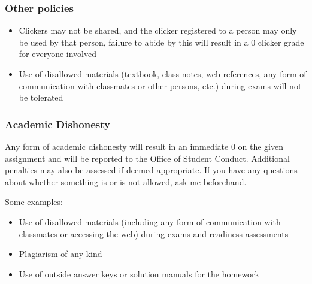 \documentclass[11pt,containsverbatim,handout,xcolor=xelatex,dvipsnames,table]{beamer}
\begin{document}
\begin{frame}
\frametitle{Other policies}

\begin{itemize}

\item Clickers may not be shared, and the clicker registered to a person may only be used by that person, failure to abide by this will result in a 0 clicker grade for everyone involved

\item Use of disallowed materials (textbook, class notes, web references, any form of communication with classmates or other persons, etc.) during exams will not be tolerated

\end{itemize}

\end{frame}


\begin{frame}
\frametitle{Academic Dishonesty}

Any form of academic dishonesty will result in an immediate 0 on the given assignment and will be reported to the Office of Student Conduct. Additional penalties may also be assessed if deemed appropriate. If you have any questions about whether something is or is not allowed, ask me beforehand.

Some examples:

\begin{itemize}

\item Use of disallowed materials (including any form of communication with classmates or accessing the web) during exams and readiness assessments

\item Plagiarism of any kind

\item Use of outside answer keys or solution manuals for the homework

\end{itemize}

\end{frame}

\end{document}
